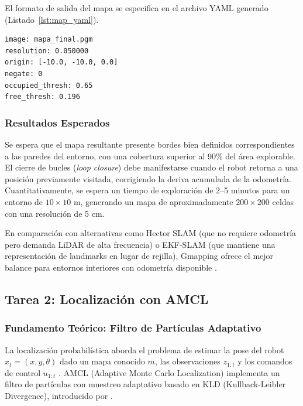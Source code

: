 \documentclass[12pt,letterpaper]{article}
\begin{document}
El formato de salida del mapa se especifica en el archivo YAML generado (Listado~\ref{lst:map_yaml}).

\begin{lstlisting}[caption={Archivo de metadatos del mapa generado (\texttt{mapa\_final.yaml}).}, label={lst:map_yaml}, style=yamlstyle]
image: mapa_final.pgm
resolution: 0.050000
origin: [-10.0, -10.0, 0.0]
negate: 0
occupied_thresh: 0.65
free_thresh: 0.196
\end{lstlisting}

\subsubsection{Resultados Esperados}

Se espera que el mapa resultante presente bordes bien definidos correspondientes a las paredes del entorno, con una cobertura superior al 90\% del área explorable. El cierre de bucles (\textit{loop closure}) debe manifestarse cuando el robot retorna a una posición previamente visitada, corrigiendo la deriva acumulada de la odometría. Cuantitativamente, se espera un tiempo de exploración de 2--5 minutos para un entorno de $10\times10$ m, generando un mapa de aproximadamente $200\times200$ celdas con una resolución de 5 cm.

En comparación con alternativas como Hector SLAM (que no requiere odometría pero demanda LiDAR de alta frecuencia) o EKF-SLAM (que mantiene una representación de landmarks en lugar de rejilla), Gmapping ofrece el mejor balance para entornos interiores con odometría disponible \citep{grisetti2007improved}.

\subsection{Tarea 2: Localización con AMCL}
\label{sec:amcl}

\subsubsection{Fundamento Teórico: Filtro de Partículas Adaptativo}

La localización probabilística aborda el problema de estimar la pose del robot $x_t = (x, y, \theta)$ dado un mapa conocido $m$, las observaciones $z_{1:t}$ y los comandos de control $u_{1:t}$ \citep{thrun2005probabilistic}. AMCL (Adaptive Monte Carlo Localization) implementa un filtro de partículas con muestreo adaptativo basado en KLD (Kullback-Leibler Divergence), introducido por \citet{fox2003adapting}.
\end{document}

